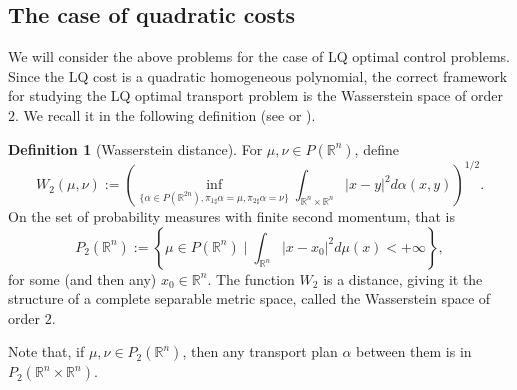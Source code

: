\documentclass[reqno]{amsart}
\theoremstyle{plain}
\newtheorem{lem}[thm]{Lemma}
\theoremstyle{definition}
\newtheorem{Def}[thm]{Definition}
\theoremstyle{remark}
\newcommand{\R}{\mathbb{R}}
\begin{document}
        \subsection{The case of quadratic costs}

                We will consider the above problems for the case of LQ optimal control problems. Since the LQ cost is a quadratic homogeneous polynomial, the correct framework for studying the LQ optimal transport problem is the Wasserstein space of order $2$. We recall it in the following definition (see \cite[Chapter 6]{Villanioldandnew} or \cite[Section 3]{Usersguide}). 
    \begin{Def}[Wasserstein distance]
		For $\mu,\nu\in P(\mathbb{R}^n)$, define
		\begin{equation}
			W_2(\mu,\nu):=\left(\inf\limits_{\{\alpha\in P(\mathbb{R}^{2n}),\pi_{1\sharp}\alpha=\mu,\pi_{2\sharp}\alpha=\nu\}}\int_{\mathbb{R}^{n}\times \R^n}|x-y|^2d\alpha(x,y)\right)^{1/2}.
		\end{equation}
		On the set of probability measures with finite second momentum, that is
		\begin{equation}
			P_2(\mathbb{R}^n):=\left\{\mu\in P(\mathbb{R}^n)\;\bigg|\;\int_{\mathbb{R}^n}|x-x_0|^2d\mu(x)<+\infty\right\},
		\end{equation}
        for some (and then any) $x_0\in\R^n$. The function $W_2$ is a distance, giving it the structure of a complete separable metric space, called the Wasserstein space of order $2$.
	\end{Def}
        Note that, if $\mu,\nu\in P_2(\mathbb{R}^n)$, then any transport plan $\alpha$ between them is in $ P_2(\mathbb{R}^{n}\times \R^n)$.
        
\end{document}
